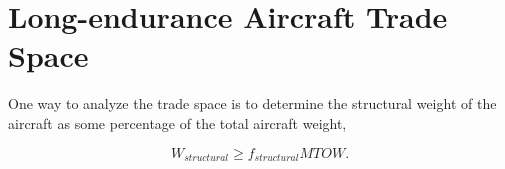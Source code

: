 \documentclass[]{aiaa-tc}%
\begin{document}
%  
% 
% 

\section{Long-endurance Aircraft Trade Space}

One way to analyze the trade space is to determine the structural weight of the aircraft as some percentage of the total aircraft weight, 

\begin{equation}
    \label{e:structualfraction}
    W_{structural} \geq f_{structural}MTOW.
\end{equation}
\end{document}
